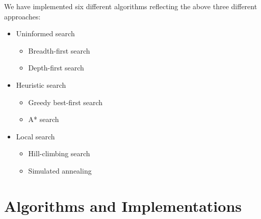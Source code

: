 \documentclass[a4paper]{article}
\begin{document}
\noindent We have implemented six different algorithms reflecting the above three different approaches: \\
\begin{itemize}
	\item Uninformed search
	\begin{itemize}
		\item Breadth-first search
		\item Depth-first search
	\end{itemize}

	\item Heuristic search
	\begin{itemize}
		\item Greedy best-first search
		\item A* search
	\end{itemize}

	\item Local search
	\begin{itemize}
		\item Hill-climbing search
		\item Simulated annealing
	\end{itemize}
\end{itemize}

 

\section{Algorithms and Implementations}
\end{document}
